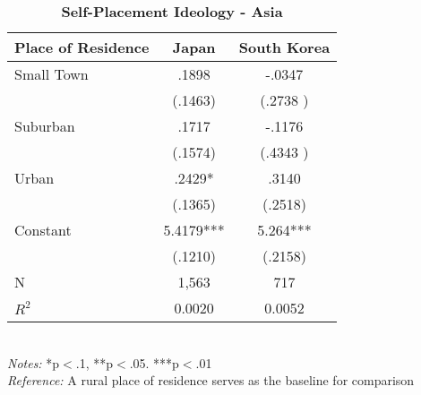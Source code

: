 \documentclass[12pt, titlepage]{article}
\newcommand\e{\emph}
\newcommand\tb{\textbf}
\begin{document}
\begin{singlespace}
	\begin{table}[H]
		\centering 
		\caption{\tb{Self-Placement Ideology - Asia}}
		\begin{tabulary}{\linewidth}{l c c}
			\\
			\hline
			\tb{Place of Residence} & \tb{Japan} & \tb{South Korea}\\
			\hline
			Small Town &.1898 & -.0347 \\
			&(.1463) & (.2738 )\\
			Suburban&.1717 & -.1176 \\
			& (.1574) & (.4343 )\\
			Urban & .2429* &.3140 \\
			& (.1365) & (.2518)\\
			Constant& 5.4179*** & 5.264*** \\
			& (.1210) & (.2158)\\
			N&1,563 & 717\\
			$R^2$& 0.0020 & 0.0052\\
			\hline
		\end{tabulary}
		\\
		\e{Notes:} *p$<$.1, **p$<$.05. ***p$<$.01 \\
		\e{Reference:} A rural place of residence serves as the baseline for comparison
		\label{table12}
	\end{table}
\end{singlespace}
\end{document}

